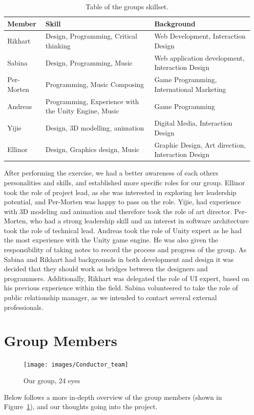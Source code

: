 \begin{table}[H]
    \centering
    \begin{tabularx}{\linewidth}{ | l | X | X |}
        \hline
        \textbf{Member} & \textbf{Skill} & \textbf{Background}  \\
        \hline
        Rikhart & Design, Programming, Critical thinking & Web Development, Interaction Design \\
        \hline
        Sabina & Design, Programming, Music & Web application development, Interaction Design \\
        \hline
        Per-Morten & Programming, Music Composing & Game Programming, International Marketing \\ 
        \hline
        Andreas & Programming, Experience with the Unity Engine, Music & Game Programming  \\
        \hline
        Yijie & Design, 3D modelling, animation & Digital Media, Interaction Design \\
        \hline
        Ellinor & Design, Graphics design, Music & Graphic Design, Art direction, Interaction Design  \\
        \hline
    \end{tabularx}
    \caption{Table of the groups skillset.}
    \label{table:skills}
\end{table}

After performing the exercise, we had a better awareness of each others personalities and skills, and established more specific roles for our group. Ellinor took the role of project lead, as she was interested in exploring her leadership potential, and Per-Morten was happy to pass on the role. Yijie, had experience with 3D modeling and animation and therefore took the role of art director. Per-Morten, who had a strong leadership skill and an interest in software architecture took the role of technical lead. Andreas took the role of Unity expert as he had the most experience with the Unity game engine. He was also given the responsibility of taking notes to record the process and progress of the group. As Sabina and Rikhart had backgrounds in both development and design it was decided that they should work as bridges between the designers and programmers. Additionally, Rikhart was delegated the role of UI expert, based on his previous experience within the field. Sabina volunteered to take the role of public relationship manager, as we intended to contact several external professionals.
\section{Group Members}
\begin{figure}[tpbh]
    \centering
    \texttt{[image: images/Conductor\_team]}
    \caption[Group Photo]{Our group, 24 eyes}
    \label{fig:conductor_team}
\end{figure}
Below follows a more in-depth overview of the group members (shown in Figure~\ref{fig:conductor_team}), and our thoughts going into the project.

